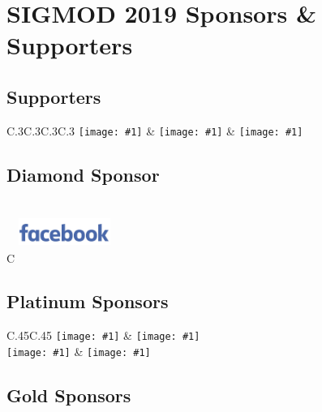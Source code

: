 \newcommand{\sponsoricon}[1]{{\texttt{[image: \#1]}}}

\clearpage
\section*{SIGMOD 2019 Sponsors \& Supporters}

\subsection*{Supporters}

\begin{tabular}{C{.3\textwidth}C{.3\textwidth}C{.3\textwidth}C{.3\textwidth}}
\sponsoricon{sponsoricons/sigmod}
&
\sponsoricon{sponsoricons/acm}
&
\sponsoricon{sponsoricons/cwi}
\end{tabular}
    
\subsection*{Diamond Sponsor}

\renewcommand{\arraystretch}{1.3}

\begin{tabular}{C{\linewidth}}
\includegraphics[width=3cm,height=2cm,keepaspectratio]{sponsoricons/facebook}
\end{tabular}

\subsection*{Platinum Sponsors}

\begin{tabular}{C{.45\textwidth}C{.45\textwidth}}
\sponsoricon{sponsoricons/elsevier}
&
\sponsoricon{sponsoricons/microsoft}
\\
\sponsoricon{sponsoricons/oracle}
&
\sponsoricon{sponsoricons/tableau}
\end{tabular}


\subsection*{Gold Sponsors}

